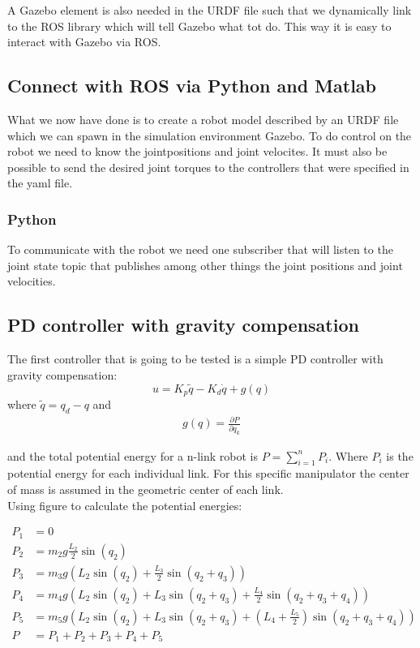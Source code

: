 A Gazebo element is also needed in the URDF file such that we dynamically link to the ROS library which will tell Gazebo what tot do. This way it is easy to interact with Gazebo via ROS. 


\subsection*{Connect with ROS via Python and Matlab}
What we now have done is to create a robot model described by an URDF file which we can spawn in the simulation environment Gazebo. To do control on the robot we need to know the jointpositions and joint velocites. It must also be possible to send the desired joint torques to the controllers that were specified in the yaml file. 

\subsubsection*{Python}
To communicate with the robot we need one subscriber that will listen to the joint state topic that publishes among other things the joint positions and joint velocities. 





\subsection*{PD controller with gravity compensation}
    The first controller that is going to be tested is a simple PD controller with gravity compensation:
    $$
        u=K_p\tilde{q} - K_d\dot{q} +g(q)
    $$
     where $\tilde{q} = q_d - q$ and 
     \begin{align}\label{eq:gravity}
     g(q) = \frac{\partial P}{\partial q_k}
     \end{align}

     
     and the total potential energy for a n-link robot is $P = \sum^n_{i=1}P_i$. Where $P_i$ is the potential energy for each individual link. For this specific manipulator the center of mass is assumed in the geometric center of each link. 
     \\
     Using figure  to calculate the potential energies:

     
     \begin{align*}
        P_1 &= 0
        \\
        P_2 &= m_2g\frac{L_2}{2}\sin{(q_2)}
        \\
        P_3 &= m_3g\left( L_2 \sin{(q_2)} + \frac{L_3}{2}\sin{(q_2 + q_3)} \right)
        \\
        P_4 &= m_4g\left( L_2 \sin{(q_2)} + L_3\sin{(q_2 + q_3)} + \frac{L_4}{2}\sin{(q_2+q_3+q_4)} \right)
        \\
        P_5 &= m_5g\left( L_2 \sin{(q_2)} + L_3\sin{(q_2 + q_3)} + \left(L_4 + \frac{L_5}{2} \right)\sin{(q_2+q_3+q_4)} \right)
        \\
        P &= P_1 + P_2 + P_3 + P_4 + P_5
     \end{align*}

